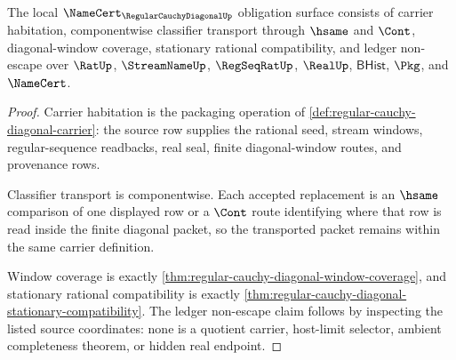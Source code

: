 \begin{theorem}
\label{thm:regular-cauchy-diagonal-namecert-obligations}
The local $\NameCert_{\RegularCauchyDiagonalUp}$ obligation surface consists of carrier habitation, componentwise classifier transport through $\hsame$ and $\Cont$, diagonal-window coverage, stationary rational compatibility, and ledger non-escape over $\RatUp$, $\StreamNameUp$, $\RegSeqRatUp$, $\RealUp$, $\mathsf{BHist}$, $\Pkg$, and $\NameCert$.
\end{theorem}
\begin{proof}
Carrier habitation is the packaging operation of \autoref{def:regular-cauchy-diagonal-carrier}: the source row supplies the rational seed, stream windows, regular-sequence readbacks, real seal, finite diagonal-window routes, and provenance rows.

Classifier transport is componentwise. Each accepted replacement is an $\hsame$ comparison of one displayed row or a $\Cont$ route identifying where that row is read inside the finite diagonal packet, so the transported packet remains within the same carrier definition.

Window coverage is exactly \autoref{thm:regular-cauchy-diagonal-window-coverage}, and stationary rational compatibility is exactly \autoref{thm:regular-cauchy-diagonal-stationary-compatibility}. The ledger non-escape claim follows by inspecting the listed source coordinates: none is a quotient carrier, host-limit selector, ambient completeness theorem, or hidden real endpoint.
\end{proof}

